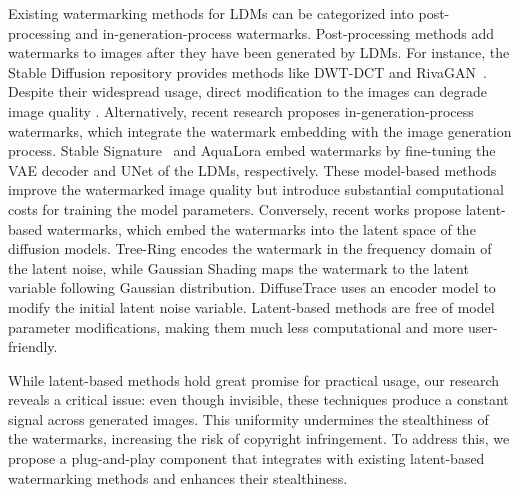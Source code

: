 Existing watermarking methods for LDMs can be categorized into post-processing and in-generation-process watermarks. Post-processing methods add watermarks to images after they have been generated by LDMs. For instance, the Stable Diffusion repository provides methods like DWT-DCT\cite{rahman2013dwt} and RivaGAN~\cite{zhang2019robust}. Despite their widespread usage, direct modification to the images can degrade image quality \cite{fernandez2023stable}. Alternatively,  recent research proposes in-generation-process watermarks, which integrate the watermark embedding with the image generation process. Stable Signature~\cite{fernandez2023stable}  and AquaLora \cite{feng2024aqualora} embed watermarks by fine-tuning the VAE decoder and UNet of the LDMs, respectively. These model-based methods improve the watermarked image quality but introduce substantial computational costs for training the model parameters.
Conversely, recent works propose latent-based watermarks, which embed the watermarks into the latent space of the diffusion models. Tree-Ring \cite{wen2023tree} encodes the watermark in the frequency domain of the latent noise, while Gaussian Shading \cite{yang2024gaussian} maps the watermark to the latent variable following Gaussian distribution. DiffuseTrace \cite{lei2024diffusetrace} uses an encoder model to modify the initial latent noise variable. Latent-based methods are free of model parameter modifications, making them much less computational and more user-friendly.  

While latent-based methods hold great promise for practical usage, our research reveals a critical issue: even though invisible, these techniques produce a constant signal across generated images. This uniformity undermines the stealthiness of the watermarks, increasing the risk of copyright infringement.
To address this, we propose a plug-and-play component that integrates with existing latent-based watermarking methods and enhances their stealthiness.
